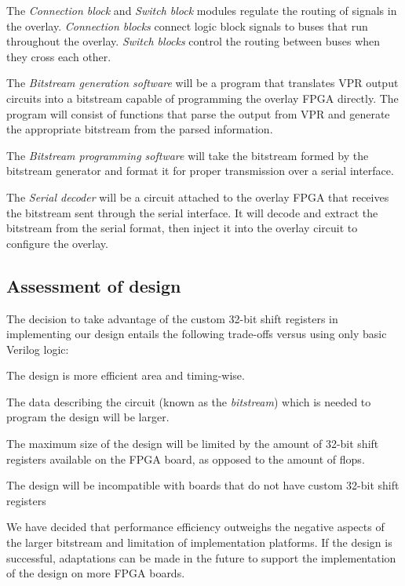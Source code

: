 The \emph{Connection block} and \emph{Switch block} modules regulate the routing of signals in the overlay.
\emph{Connection blocks} connect logic block signals to buses that run throughout the 
overlay.
\emph{Switch blocks} control the routing between buses when they cross each other.

The \emph{Bitstream generation software} will be a program that translates VPR output circuits into a 
bitstream capable of programming the overlay FPGA directly.
The program will consist of functions that parse the output from VPR and generate the 
appropriate bitstream from the parsed information.

The \emph{Bitstream programming software} will take the bitstream formed by the bitstream generator 
and format it for proper transmission over a serial interface.

The \emph{Serial decoder} will be a circuit attached to the overlay FPGA that receives the 
bitstream sent through the serial interface.
It will decode and extract the bitstream 
from the serial format, then inject it into the overlay circuit to configure the 
overlay.



\subsection{Assessment of design}

The decision to take advantage of the custom 32-bit shift registers in implementing our design entails the following trade-offs versus using only basic Verilog logic:
\begin{itemlist}
	\item The design is more efficient area and timing-wise.
	\item The data describing the circuit (known as the \emph{bitstream}) which is needed to program the design will be larger.
	\item The maximum size of the design will be limited by the amount of 32-bit shift registers available on the FPGA board, as opposed to the amount of flops.
	\item The design will be incompatible with boards that do not have custom 32-bit shift registers
\end{itemlist}

We have decided that performance efficiency outweighs the negative aspects of the larger bitstream and limitation of implementation platforms.
If the design is successful, adaptations can be made in the future to support the implementation of the design on more FPGA boards.

